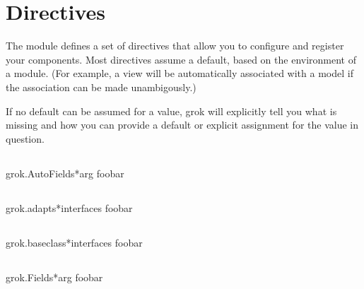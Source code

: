 \chapter{Directives}

The  module defines a set of directives that allow you to
configure and register your components. Most directives assume a default, based
on the environment of a module. (For example, a view will be automatically
associated with a model if the association can be made unambigously.)

If no default can be assumed for a value, grok will explicitly tell you what is
missing and how you can provide a default or explicit assignment for the value
in question.

    \section{}

        \begin{funcdesc}{grok.AutoFields}{*arg}
        foobar
        \end{funcdesc}

    \section{}

        \begin{funcdesc}{grok.adapts}{*interfaces}
        foobar
        \end{funcdesc}

    \section{}

        \begin{funcdesc}{grok.baseclass}{*interfaces}
        foobar
        \end{funcdesc}

    \section{}

        \begin{funcdesc}{grok.Fields}{*arg}
        foobar
        \end{funcdesc}

    \section{}

